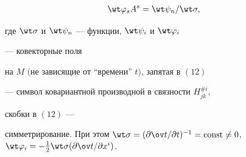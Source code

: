 \begin{thm}
\begin{align}
\wt\varphi_s A^s&=\wt\psi_n/\wt\sigma, 


\end{align} 


где $\wt\sigma$ и $\wt\psi_n$ --- функции, $\wt\psi_i$ и $\wt\varphi_i$ 


--- ковекторные поля 


на $M$ $($не зависящие от ``времени'' $t)$, запятая в $(12)$ 


--- символ ковариантной производной в связности $H^{\# i}_{j k}$, 


скобки в $(12)$ --- 


симметрирование. При этом $\wt\sigma=(\partial\ov t/\partial 


t)^{-1}=\const\ne0$, $\wt\varphi_i=-\frac{1}{2}\wt\sigma(\partial\ov 


t/\partial x^i)$. 


\end{thm} 


 


